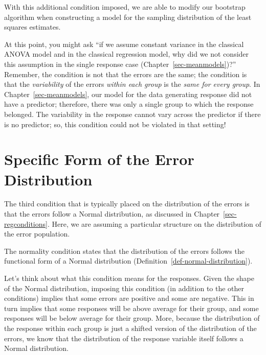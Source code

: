 \documentclass[
  letterpaper,
  DIV=11,
  numbers=noendperiod]{scrreprt}
\theoremstyle{definition}
\theoremstyle{definition}
\theoremstyle{plain}
\theoremstyle{remark}
\begin{document}
With this additional condition imposed, we are able to modify our
bootstrap algorithm when constructing a model for the sampling
distribution of the least squares estimates.

At this point, you might ask ``if we assume constant variance in the
classical ANOVA model and in the classical regression model, why did we
not consider this assumption in the single response case
(Chapter~\ref{sec-meanmodels})?'' Remember, the condition is not that
the errors are the same; the condition is that the \emph{variability} of
the errors \emph{within each group} is the \emph{same for every group}.
In Chapter~\ref{sec-meanmodels}, our model for the data generating
response did not have a predictor; therefore, there was only a single
group to which the response belonged. The variability in the response
cannot vary across the predictor if there is no predictor; so, this
condition could not be violated in that setting!

\section{Specific Form of the Error
Distribution}\label{specific-form-of-the-error-distribution-1}

The third condition that is typically placed on the distribution of the
errors is that the errors follow a Normal distribution, as discussed in
Chapter~\ref{sec-regconditions}. Here, we are assuming a particular
structure on the distribution of the error population.

\begin{tcolorbox}[enhanced jigsaw, colbacktitle=quarto-callout-note-color!10!white, colback=white, left=2mm, title=\textcolor{quarto-callout-note-color}{\faInfo}\hspace{0.5em}{Normality}, toptitle=1mm, leftrule=.75mm, breakable, bottomrule=.15mm, arc=.35mm, rightrule=.15mm, toprule=.15mm, coltitle=black, opacityback=0, colframe=quarto-callout-note-color-frame, opacitybacktitle=0.6, bottomtitle=1mm, titlerule=0mm]

The normality condition states that the distribution of the errors
follows the functional form of a Normal distribution
(Definition~\ref{def-normal-distribution}).

\end{tcolorbox}

Let's think about what this condition means for the responses. Given the
shape of the Normal distribution, imposing this condition (in addition
to the other conditions) implies that some errors are positive and some
are negative. This in turn implies that some responses will be above
average for their group, and some responses will be below average for
their group. More, because the distribution of the response within each
group is just a shifted version of the distribution of the errors, we
know that the distribution of the response variable itself follows a
Normal distribution.
\end{document}
